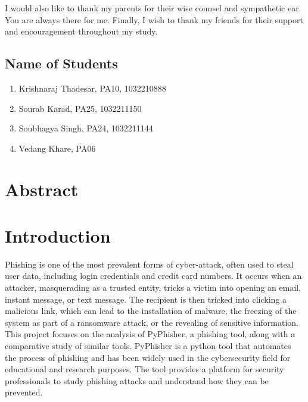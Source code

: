 \documentclass[openany]{report}
\begin{document}
I would also like to thank my parents for their wise counsel and sympathetic ear. You are always there for me. Finally, I wish to thank my friends for their support and encouragement throughout my study.



\section*{Name of Students}
\begin{enumerate}
    \item Krishnaraj Thadesar, PA10, 1032210888
    \item Sourab Karad, PA25, 1032211150
    \item Soubhagya Singh, PA24, 1032211144
    \item Vedang Khare, PA06
\end{enumerate}

\thispagestyle{empty}
\clearpage

\chapter*{Abstract}
\thispagestyle{empty}
\clearpage

\listoffigures
\clearpage
\listoftables
\clearpage
\setcounter{page}{1}

\chapter{Introduction}

Phishing is one of the most prevalent forms of cyber-attack, often used to steal user data, including login credentials and credit card numbers. It occurs when an attacker, masquerading as a trusted entity, tricks a victim into opening an email, instant message, or text message. The recipient is then tricked into clicking a malicious link, which can lead to the installation of malware, the freezing of the system as part of a ransomware attack, or the revealing of sensitive information.\\

This project focuses on the analysis of PyPhisher, a phishing tool, along with a comparative study of similar tools. PyPhisher is a python tool that automates the process of phishing and has been widely used in the cybersecurity field for educational and research purposes. The tool provides a platform for security professionals to study phishing attacks and understand how they can be prevented.\\
\end{document}
